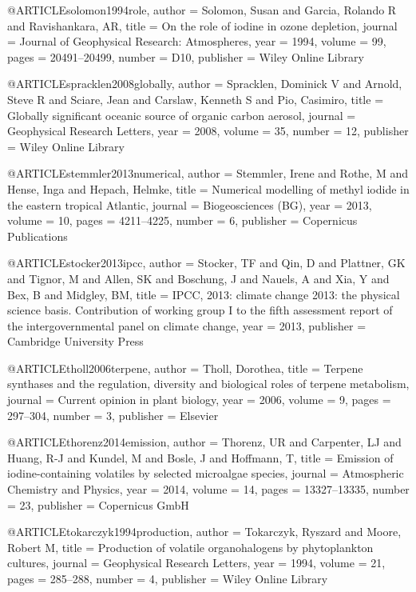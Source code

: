 @ARTICLE{solomon1994role,
  author = {Solomon, Susan and Garcia, Rolando R and Ravishankara, AR},
  title = {On the role of iodine in ozone depletion},
  journal = {Journal of Geophysical Research: Atmospheres},
  year = {1994},
  volume = {99},
  pages = {20491--20499},
  number = {D10},
  publisher = {Wiley Online Library}
}

@ARTICLE{spracklen2008globally,
  author = {Spracklen, Dominick V and Arnold, Steve R and Sciare, Jean and Carslaw,
	Kenneth S and Pio, Casimiro},
  title = {Globally significant oceanic source of organic carbon aerosol},
  journal = {Geophysical Research Letters},
  year = {2008},
  volume = {35},
  number = {12},
  publisher = {Wiley Online Library}
}

@ARTICLE{stemmler2013numerical,
  author = {Stemmler, Irene and Rothe, M and Hense, Inga and Hepach, Helmke},
  title = {Numerical modelling of methyl iodide in the eastern tropical Atlantic},
  journal = {Biogeosciences (BG)},
  year = {2013},
  volume = {10},
  pages = {4211--4225},
  number = {6},
  publisher = {Copernicus Publications}
}

@ARTICLE{stocker2013ipcc,
  author = {Stocker, TF and Qin, D and Plattner, GK and Tignor, M and Allen,
	SK and Boschung, J and Nauels, A and Xia, Y and Bex, B and Midgley,
	BM},
  title = {IPCC, 2013: climate change 2013: the physical science basis. Contribution
	of working group I to the fifth assessment report of the intergovernmental
	panel on climate change},
  year = {2013},
  publisher = {Cambridge University Press}
}

@ARTICLE{tholl2006terpene,
  author = {Tholl, Dorothea},
  title = {Terpene synthases and the regulation, diversity and biological roles
	of terpene metabolism},
  journal = {Current opinion in plant biology},
  year = {2006},
  volume = {9},
  pages = {297--304},
  number = {3},
  publisher = {Elsevier}
}

@ARTICLE{thorenz2014emission,
  author = {Thorenz, UR and Carpenter, LJ and Huang, R-J and Kundel, M and Bosle,
	J and Hoffmann, T},
  title = {Emission of iodine-containing volatiles by selected microalgae species},
  journal = {Atmospheric Chemistry and Physics},
  year = {2014},
  volume = {14},
  pages = {13327--13335},
  number = {23},
  publisher = {Copernicus GmbH}
}

@ARTICLE{tokarczyk1994production,
  author = {Tokarczyk, Ryszard and Moore, Robert M},
  title = {Production of volatile organohalogens by phytoplankton cultures},
  journal = {Geophysical Research Letters},
  year = {1994},
  volume = {21},
  pages = {285--288},
  number = {4},
  publisher = {Wiley Online Library}
}

